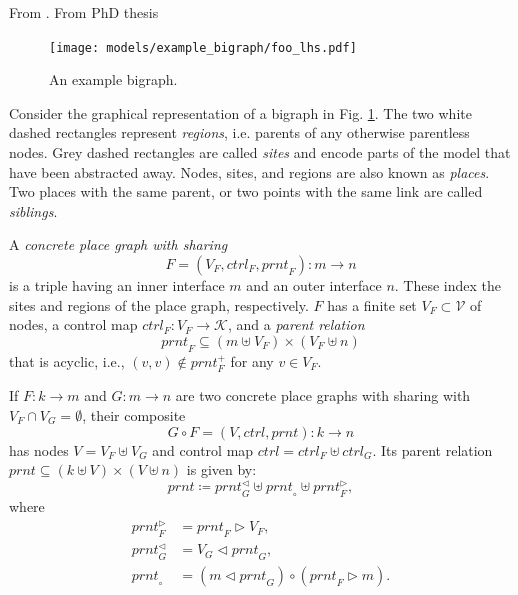 \documentclass[runningheads]{llncs}
\newcommand\ctrl{\mathit{ctrl}}
\newcommand\prnt{\mathit{prnt}}
\begin{document}
From \cite{dblp:journals/tcs/sevegnanic15}.
From PhD thesis \cite{DBLP:phd/ethos/Sevegnani12}

\begin{figure}
  \texttt{[image: models/example\_bigraph/foo\_lhs.pdf]}
  \caption{An example bigraph.}
  \label{example_bigraph}
\end{figure}

Consider the graphical representation of a bigraph in Fig.
\ref{example_bigraph}. The two white dashed rectangles represent \emph{regions},
i.e. parents of any otherwise parentless nodes. Grey dashed rectangles are
called \emph{sites} and encode parts of the model that have been abstracted
away. Nodes, sites, and regions are also known as \emph{places}. Two places with
the same parent, or two points with the same link are called \emph{siblings}.

\begin{definition}
  A \emph{concrete place graph with sharing}
  \[ F = (V_F, \ctrl_F, \prnt_F) : m \to n \]
  is a triple having an inner interface $m$ and an outer interface $n$. These
  index the sites and regions of the place graph, respectively. $F$ has a finite
  set $V_F \subset \mathcal{V}$ of nodes, a control map $\ctrl_F : V_F \to
  \mathcal{K}$, and a \emph{parent relation}
  \[ \prnt_F \subseteq (m \uplus V_F) \times (V_F \uplus n) \]
  that is acyclic, i.e., $(v, v) \not\in \prnt_F^+$ for any $v \in V_F$.
\end{definition}

\begin{definition}
  If $F : k \to m$ and $G : m \to n$ are two concrete place graphs with sharing
  with $V_F \cap V_G = \emptyset$, their composite
  \[ G \circ F = (V, \ctrl, \prnt) : k \to n \]
  has nodes $V = V_F \uplus V_G$ and control map $\ctrl = \ctrl_F \uplus
  \ctrl_G$. Its parent relation $\prnt \subseteq (k \uplus V) \times (V \uplus
  n)$ is given by:
  \[ \prnt \coloneqq \prnt_G^\lhd \uplus \prnt_\circ \uplus \prnt_F^\rhd, \]
  where
  \begin{align*}
    \prnt_F^\rhd &= \prnt_F \rhd V_F, \\
    \prnt_G^\lhd &= V_G \lhd \prnt_G, \\
    \prnt_\circ &= (m \lhd \prnt_G) \circ (\prnt_F \rhd m).
  \end{align*}
\end{definition}
\end{document}
